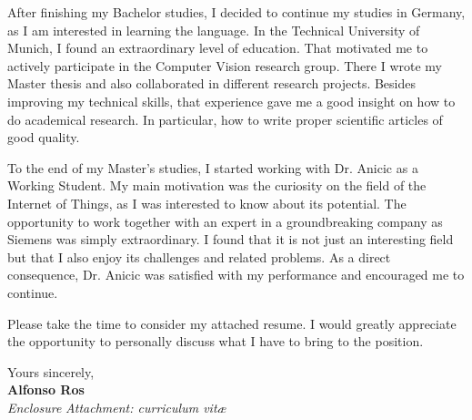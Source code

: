 \documentclass[11pt]{article}
\begin{document}
After finishing my Bachelor studies, I decided to continue my studies in 
Germany, as I am interested in learning the language. In the Technical 
University of Munich, I found an extraordinary level of education. That 
motivated me to actively participate in the Computer Vision research group.  
There I wrote my Master thesis and also collaborated in different research 
projects. Besides improving my technical skills, that experience gave me a good 
insight on how to do academical research. In particular, how to write proper 
scientific articles of good quality.

To the end of my Master's studies, I started working with Dr. Anicic as a 
Working Student. My main motivation was the curiosity on the field of the 
Internet of Things, as I was interested to know about its potential. The 
opportunity to work together with an expert in a groundbreaking company as Siemens was 
simply extraordinary. I found that it is not just an interesting field but that
I also enjoy its challenges and related problems. As a direct 
consequence, Dr. Anicic was satisfied with my performance and encouraged me to 
continue.

Please take the time to consider my attached resume. I would greatly appreciate 
the opportunity to personally discuss what I have to bring to the position.

Yours sincerely,\\[1em] %
%
{\bfseries Alfonso Ros}\\[1.5em]
%
{\slshape Enclosure}
{\slshape Attachment: curriculum vit\ae{}}
\end{document}
